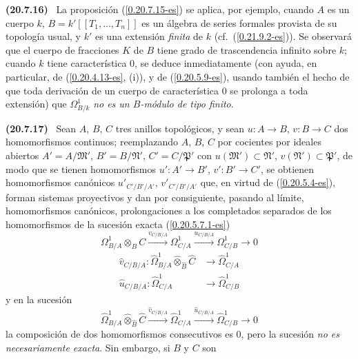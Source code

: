 \documentclass[10pt,oneside]{book}
\makeatletter
\newcommand{\sref}[1]{\textup{(\ref{#1})}}
\newcommand{\setmanualcurrentlabel}[1]{\def\@currentlabel{#1}}
\newenvironment{env}[1][]{\setmanualcurrentlabel{#1}\par\medskip\noindent\textbf{(#1)}\ }{\par}
\makeatother
\begin{document}
\begin{env}[20.7.16]
\label{0.20.7.16-es}
La proposición \sref{0.20.7.15-es} se aplica, por ejemplo, cuando $A$ es un
cuerpo $k$, $B=k'[[T_1,\ldots,T_n]]$ es un álgebra de series formales provista de
su topología usual, y $k'$ es una extensión \emph{finita} de $k$ (cf.\
\sref{0.21.9.2-es}). Se observará que el cuerpo de fracciones $K$ de $B$ tiene
grado de trascendencia infinito sobre $k$; cuando $k$ tiene característica
$0$, se deduce inmediatamente (con ayuda, en particular, de
(\ref{0.20.4.13-es}, (i)), y de \sref{0.20.5.9-es}, usando también el hecho de
que toda derivación de un cuerpo de característica $0$ se prolonga a toda
extensión) que $\Omega^1_{B/k}$ \emph{no es un $B$-módulo de tipo finito}.
\end{env}

\begin{env}[20.7.17]
\label{0.20.7.17-es}
Sean $A$, $B$, $C$ tres anillos topológicos, y sean $u:A\to B$, $v:B\to C$
dos homomorfismos continuos; reemplazando $A$, $B$, $C$ por cocientes por
ideales abiertos $A'=A/\mathfrak{M}'$, $B'=B/\mathfrak{N}'$,
$C'=C/\mathfrak P'$ con $u(\mathfrak{M}')\subset\mathfrak{N}'$,
$v(\mathfrak{N}')\subset\mathfrak{P}'$, de modo que se tienen homomorfismos
$u':A'\to B'$, $v':B'\to C'$, se obtienen homomorfismos canónicos
$u'_{C'/B'/A'}$, $v'_{C'/B'/A'}$ que, en virtud de
\sref{0.20.5.4-es}, forman sistemas proyectivos y dan por consiguiente,
pasando al límite, homomorfismos canónicos, prolongaciones a los completados
separados de los homomorfismos de la sucesión exacta
\sref{0.20.5.7.1-es}
\[
  \Omega^1_{B/A}\otimes_B C\xrightarrow{v_{C/B/A}}\Omega^1_{C/A}
  \xrightarrow{u_{C/B/A}}\Omega^1_{C/B}\to0
\]
\begin{align}
  \widehat v_{C/B/A}:\widehat{\Omega}^1_{B/A}
  \widehat\otimes_{\widehat B}\widehat C&\to\widehat{\Omega}^1_{C/A}
  \tag{20.7.17.1}\label{0.20.7.17.1-es}\\
  \widehat u_{C/B/A}:\widehat{\Omega}^1_{C/A}&\to
  \widehat{\Omega}^1_{C/B} \tag{20.7.17.2}\label{0.20.7.17.2-es}
\end{align}
y en la sucesión
\begin{equation}
\tag{20.7.17.3}
\label{0.20.7.17.3-es}
  \widehat{\Omega}^1_{B/A}\widehat\otimes_{\widehat B}\widehat C
  \xrightarrow{\widehat v_{C/B/A}}\widehat{\Omega}^1_{C/A}
  \xrightarrow{\widehat u_{C/B/A}}\widehat{\Omega}^1_{C/B}\to0
\end{equation}
la composición de dos homomorfismos consecutivos es $0$, pero la sucesión
\emph{no es necesariamente exacta}. Sin embargo, si $B$ y $C$ son

\end{env}
\end{document}
